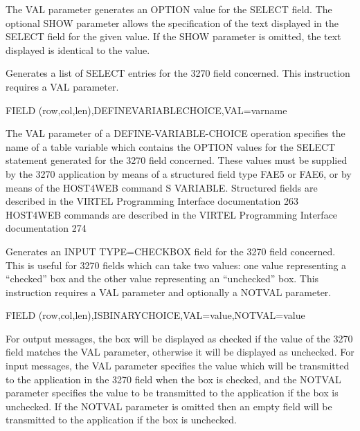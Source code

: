 \documentclass[letterpaper,10pt,english]{sphinxmanual}
\begin{document}
The VAL parameter generates an OPTION value for the SELECT field.
The optional SHOW parameter allows the specification of the text displayed in the SELECT field for the given value. If
the SHOW parameter is omitted, the text displayed is identical to the value.


Generates a list of SELECT entries for the 3270 field concerned. This instruction requires a VAL parameter.

\begin{sphinxVerbatim}[commandchars=\\\{\}]
FIELD\PYGZdl{} (row,col,len),DEFINE\PYGZhy{}VARIABLE\PYGZhy{}CHOICE,VAL=varname
\end{sphinxVerbatim}

The VAL parameter of a DEFINE-VARIABLE-CHOICE operation specifies the name of a table variable which contains the
OPTION values for the SELECT statement generated for the 3270 field concerned. These values must be supplied by the
3270 application by means of a structured field type FAE5 or FAE6, or by means of the HOST4WEB command S
VARIABLE. Structured fields are described in the VIRTEL Programming Interface documentation 263 HOST4WEB
commands are described in the VIRTEL Programming Interface documentation 274


Generates an INPUT TYPE=CHECKBOX field for the 3270 field concerned. This is useful for 3270 fields which can take
two values: one value representing a “checked” box and the other value representing an “unchecked” box. This
instruction requires a VAL parameter and optionally a NOTVAL parameter.

\begin{sphinxVerbatim}[commandchars=\\\{\}]
FIELD\PYGZdl{} (row,col,len),IS\PYGZhy{}BINARY\PYGZhy{}CHOICE,VAL=\PYGZsq{}value\PYGZsq{},NOTVAL=\PYGZsq{}value\PYGZsq{}
\end{sphinxVerbatim}

For output messages, the box will be displayed as checked if the value of the 3270 field matches the VAL parameter,
otherwise it will be displayed as unchecked. For input messages, the VAL parameter specifies the value which will be
transmitted to the application in the 3270 field when the box is checked, and the NOTVAL parameter specifies the
value to be transmitted to the application if the box is unchecked. If the NOTVAL parameter is omitted then an empty
field will be transmitted to the application if the box is unchecked.
\end{document}
